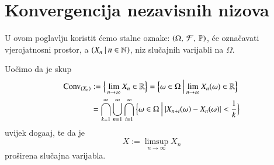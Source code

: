 
\chapter{Konvergencija nezavisnih nizova}

U ovom poglavlju koristit \' cemo stalne oznake: $(\Omega, \: \mathcal{F}, \: \mathbb{P})$, \' ce ozna\v cavati vjerojatnosni prostor, a $({X_n} \: | \: {n \in \mathbb{N}})$, niz slu\v cajnih varijabli na $\Omega$.

Uo\v cimo da je skup
\begin{equation*}
    \begin{aligned}
        \mathrm{Conv}_{(X_n)} &:= \Big\{ \lim\limits_{n \to \infty} X_n \in \mathbb{R} \Big\} = \Big\{ {\omega \in \Omega} \: \Big| \: {\lim\limits_{n \to \infty} X_n (\omega) \in \mathbb{R}} \Big\}\\
        &= \bigcap\limits_{k = 1}^{\infty} \bigcup\limits_{n = 1}^{\infty} \bigcap\limits_{i = 1}^{\infty} \Big\{ {\omega \in \Omega} \: \Big| \: {|X_{n + i} (\omega) - X_n (\omega)| < \frac{1}{k}} \Big\}
    \end{aligned}
\end{equation*}
uvijek doga\dj aj, te da je
\begin{equation*}
    X:= \limsup\limits_{n \to \infty} X_n
\end{equation*}
pro\v sirena slu\v cajna varijabla.

